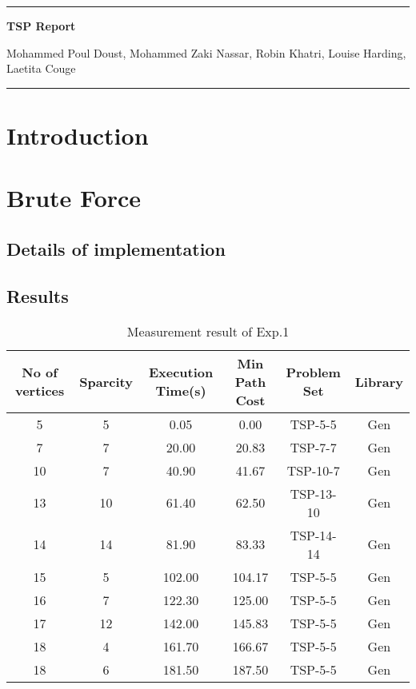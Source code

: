 \documentclass[a4paper, 11pt]{article}
\begin{document}
\begin{center}
\hrule

\vspace{.4cm}
{\bf {\Huge TSP Report}}
\vspace{.2cm}
\end{center}
{Mohammed Poul Doust,  Mohammed Zaki Nassar,  Robin Khatri,  Louise Harding,  Laetita Couge}  \\
\hrule

\section{Introduction}

\section{Brute Force}

\subsection{Details of implementation}

\subsection{Results}

\begin{table}[!h]
\centering
\begin{tabular}{|c|c|c|c|c|c|}
	\hline
	No of vertices & Sparcity  & Execution Time(s) & Min Path Cost & Problem Set & Library  \\
	\hline\hline
	5 & 5 & 0.05 & 0.00 & TSP-5-5 & Gen\\
	\hline
	7 & 7 & 20.00 &20.83& TSP-7-7 & Gen\\
	\hline
	10 & 7 & 40.90 &41.67& TSP-10-7 & Gen\\
	\hline
	13 & 10 & 61.40 &62.50& TSP-13-10 & Gen\\
	\hline
	14 & 14 & 81.90 &83.33& TSP-14-14 & Gen\\
	\hline
	15 & 5 & 102.00 &104.17& TSP-5-5 & Gen\\
	\hline
	16 & 7 & 122.30 &125.00& TSP-5-5 & Gen\\
	\hline
	17 & 12 & 142.00 &145.83& TSP-5-5 & Gen\\
	\hline
	18 & 4 & 161.70 &166.67& TSP-5-5 & Gen\\
	\hline
	18 & 6 & 181.50 &187.50& TSP-5-5 & Gen\\
	\hline
\end{tabular}
\caption{Measurement result of Exp.1}
\label{t1}
\end{table}
\end{document}

